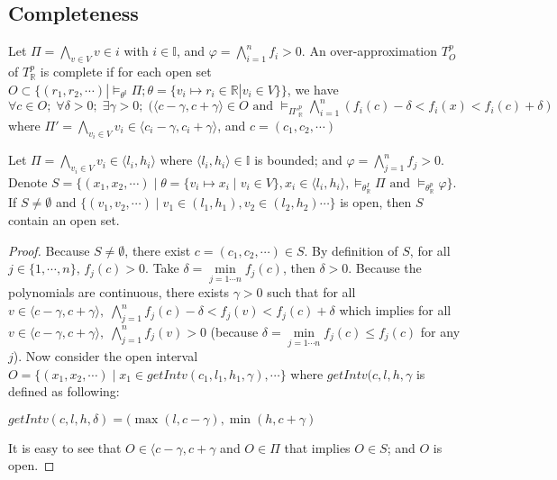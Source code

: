 \subsection{Completeness}
\begin{definition} \label{def:OT-complete}
\sloppy
Let $\Pi = \bigwedge\limits_{v \in V} v \in i$ with $i \in \mathbb{I}$, and ${\varphi = \bigwedge\limits_{i=1}^n f_i > 0}$. An over-approximation $T^p_O$ of $T^p_\mathbb{R}$ is complete if for each open set ${O \subset \{(r_1,r_2,\cdots) |  \models_{\theta^\mathbb{I}} \Pi; \theta = \{v_i \mapsto r_i \in \mathbb{R} | v_i  \in V\}\}}$, we have ${\forall c \in O; \; \forall \delta > 0; \; \exists \gamma > 0; \; (\langle c - \gamma, c + \gamma \rangle \in O \text{ and } \models_{\Pi'^p_\mathbb{R}} \bigwedge\limits_{i=1}^n(f_i(c)-\delta < f_i(x) < f_i(c) + \delta)}$ where ${\Pi' = \bigwedge\limits_{v_i \in V} v_i \in \langle c_i - \gamma, c_i + \gamma \rangle}$, and ${c = (c_1, c_2, \cdots)}$
\end{definition}

\begin{lemma} \label{lem:sat-complete}
Let $\Pi = \bigwedge\limits_{v_i \in V} v_i \in \langle l_i, h_i \rangle$ where $\langle l_i, h_i \rangle \in \mathbb{I}$ is bounded; and ${\varphi = \bigwedge\limits_{j = 1}^n f_j > 0}$. Denote $S = \{(x_1, x_2, \cdots) \mid \theta = \{v_i \mapsto x_i \mid v_i \in V \}, x_i \in \langle l_i, h_i \rangle, \models_{\theta^I_\mathbb{R}} \Pi \text{ and } \models_{\theta^p_\mathbb{R}}\varphi \}$. If $S \neq \emptyset$ and $\{(v_1, v_2, \cdots) \mid v_1 \in (l_1, h_1), v_2 \in (l_2, h_2) \cdots \}$ is open, then $S$ contain an open set.
\end{lemma}

\begin{proof}
\sloppy
Because $S \neq \emptyset$, there exist $c = (c_1, c_2, \cdots) \in S$. By definition of $S$, for all ${j \in \{1, \cdots, n\}, \, f_j(c) > 0}$. Take $\delta = \min\limits_{j=1\cdots n} f_j(c)$, then $\delta > 0$. Because the polynomials are continuous, there exists $\gamma > 0$ such that for all $v \in \langle c - \gamma, {c + \gamma \rangle, \; \bigwedge\limits_{j=1}^n f_j(c) - \delta < f_j(v) < f_j(c) + \delta}$ which implies for all ${v \in \langle c - \gamma, c + \gamma \rangle, \; \bigwedge\limits_{j=1}^n f_j(v) > 0}$ (because $\delta = \min\limits_{j=1\cdots n}f_j(c) \le f_j(c)$ for any $j$).
Now consider the open interval $O = \{(x_1, x_2, \cdots) \mid x_1 \in getIntv(c_1, l_1, h_1, \gamma), \cdots \}$ where $getIntv(c, l, h, \gamma$ is defined as following:
\begin{center}
$getIntv(c, l, h, \delta) = (\max(l, c -\gamma), \min(h, c + \gamma)$
\end{center}
It is easy to see that $O \in \langle c - \gamma, c + \gamma$ and $O \in \Pi$ that implies $O \in S$; and $O$ is open.
\end{proof}


